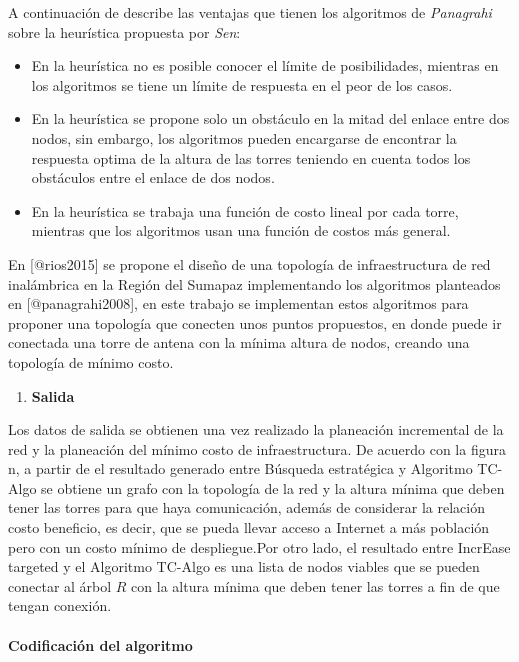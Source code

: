 \documentclass[]{article}
\providecommand{\tightlist}{%
  \setlength{\itemsep}{0pt}\setlength{\parskip}{0pt}}
\let\oldparagraph\paragraph
\renewcommand{\paragraph}[1]{\oldparagraph{#1}\mbox{}}
\begin{document}
A continuación de describe las ventajas que tienen los algoritmos de
\emph{Panagrahi} sobre la heurística propuesta por \emph{Sen}:

\begin{itemize}
\item
  En la heurística no es posible conocer el límite de posibilidades,
  mientras en los algoritmos se tiene un límite de respuesta en el peor
  de los casos.
\item
  En la heurística se propone solo un obstáculo en la mitad del enlace
  entre dos nodos, sin embargo, los algoritmos pueden encargarse de
  encontrar la respuesta optima de la altura de las torres teniendo en
  cuenta todos los obstáculos entre el enlace de dos nodos.
\item
  En la heurística se trabaja una función de costo lineal por cada
  torre, mientras que los algoritmos usan una función de costos más
  general.
\end{itemize}

En {[}@rios2015{]} se propone el diseño de una topología de
infraestructura de red inalámbrica en la Región del Sumapaz
implementando los algoritmos planteados en {[}@panagrahi2008{]}, en este
trabajo se implementan estos algoritmos para proponer una topología que
conecten unos puntos propuestos, en donde puede ir conectada una torre
de antena con la mínima altura de nodos, creando una topología de mínimo
costo.

\begin{enumerate}
\def\labelenumi{\arabic{enumi}.}
\setcounter{enumi}{3}
\tightlist
\item
  \textbf{Salida}
\end{enumerate}

Los datos de salida se obtienen una vez realizado la planeación
incremental de la red y la planeación del mínimo costo de
infraestructura. De acuerdo con la figura n, a partir de el resultado
generado entre Búsqueda estratégica y Algoritmo TC-Algo se obtiene un
grafo con la topología de la red y la altura mínima que deben tener las
torres para que haya comunicación, además de considerar la relación
costo beneficio, es decir, que se pueda llevar acceso a Internet a más
población pero con un costo mínimo de despliegue.Por otro lado, el
resultado entre IncrEase targeted y el Algoritmo TC-Algo es una lista de
nodos viables que se pueden conectar al árbol \(R\) con la altura mínima
que deben tener las torres a fin de que tengan conexión.

\paragraph{Codificación del
algoritmo}\label{codificaciuxf3n-del-algoritmo}
\end{document}
